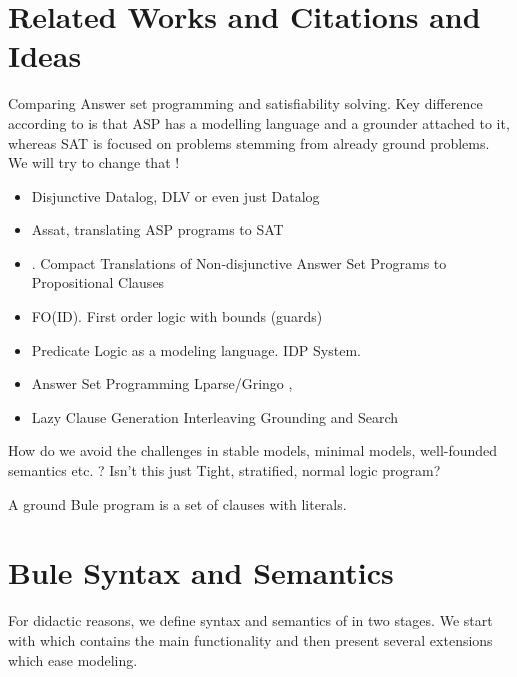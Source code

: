 \documentclass[conference]{IEEEtran}
\begin{document}
\section{Related Works and Citations and Ideas}


Comparing Answer set programming and satisfiability solving. Key difference
according to \cite{Lierler17} is that ASP has a modelling language and a
grounder attached to it, whereas SAT is focused on problems stemming from
already ground problems. We will try to change that !


\begin{itemize}
    \item Disjunctive Datalog, DLV \cite{Eiter97} or even just Datalog \cite{Gottlob89}
    \item Assat, translating ASP programs to SAT \cite{Lin04}
    \item \cite{Janhunen11}. Compact Translations of Non-disjunctive Answer Set
        Programs to Propositional Clauses
    \item FO(ID). First order logic with bounds (guards) \cite{Wittocx10}
    \item Predicate Logic as a modeling language. IDP System. \cite{Cat18}
    \item Answer Set Programming Lparse/Gringo \cite{Gebser15}, \cite{Ferraris05}
    \item Lazy Clause Generation Interleaving Grounding and Search \cite{Cat15}
\end{itemize}

How do we avoid the challenges in stable models, minimal models, well-founded
semantics etc. ?  Isn't this just Tight, stratified, normal logic program?


A ground Bule program is a set of clauses with literals. 


\section{Bule Syntax and Semantics}

For didactic reasons, we define syntax and semantics of \bule in two
stages. We start with \bcore which contains the main functionality and
then present several extensions which ease modeling. 

\subsection{\bcore}
\end{document}

